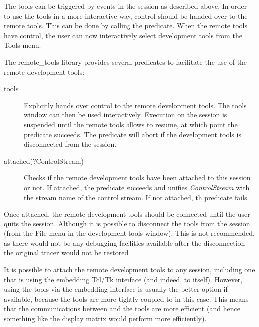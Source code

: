 The tools can be triggered by events in the {\eclipse} session as described
above. In order to use the tools in a more interactive way, control should
be handed over to the remote tools. This can be done by calling the
 predicate. When the remote tools have control, the user can
now interactively select development tools from the Tools menu.

The remote_tools library provides several predicates to facilitate the use
of the remote development tools:

\begin{description}
\item[tools] Explicitly hands over control to the remote development
tools. The tools window can then be used interactively. Execution on the
{\eclipse} session is suspended until the remote tools allows {\eclipse} to
resume, at which point the predicate succeeds. The predicate will abort if
the development tools is disconnected from the {\eclipse} session.

\item[attached(?ControlStream)] 
	Checks if the remote development tools have been attached to this 
        {\eclipse} session or not. If attached, the predicate succeeds and 
        unifies {\it ControlStream\/} with the stream name of the control
        stream. If not attached, th  predicate fails.

\end{description}

Once attached, the remote development tools should be connected until the
user quits the session. Although it is possible to disconnect the tools
from the {\eclipse} session (from the File menu in the development tools
window). This is not recommended, as there would not be any debugging
facilities available after the disconnection -- the original tracer would
not be restored. 

It is possible to attach the remote development tools to any {\eclipse}
session, including one that is using the embedding Tcl/Tk interface (and
indeed, to {\tkeclipse} itself). However, using the tools via the embedding
interface is usually the better option if available, because the tools are
more tightly coupled to {\eclipse} in this case. This means that the
communications between {\eclipse} and the tools are more efficient (and
hence something like the display matrix would perform more efficiently).



